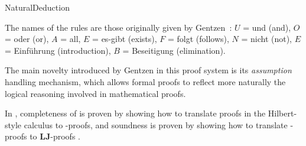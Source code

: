 \begin{entry}{NaturalDeduction}
\begin{clarifications}
The names of the rules are those originally given by Gentzen~\cite{Gentzen1935}: $U$ = und (and), $O$ = oder (or), $A$ = all, $E$ = es-gibt (exists), $F$ = folgt (follows), $N$ = nicht (not), $E$ = Einf\"uhrung (introduction), $B$ = Beseitigung (elimination).
\end{clarifications}


\begin{history}
The main novelty introduced by Gentzen in this proof system is its 
\emph{assumption} handling mechanism, which allows formal proofs to reflect 
more naturally the logical reasoning involved in mathematical proofs.
\end{history}


\begin{technicalities}
In \cite{Gentzen1935}, completeness of \NJ is proven by showing how to translate proofs in the Hilbert-style calculus \LHJ {} to \NJ-proofs, and soundness is proven by showing how to translate \NJ-proofs to $\mathbf{LJ}$-proofs .
\end{technicalities}


\end{entry}
